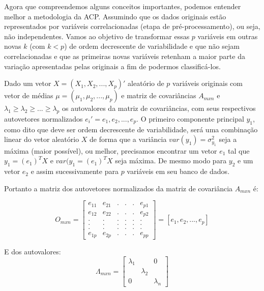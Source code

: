 \documentclass[
]{book}
\begin{document}
Agora que compreendemos alguns conceitos importantes, podemos entender melhor a metodologia da ACP. Assumindo que os dados originais estão representados por variáveis correlacionadas (etapa de pré-processamento), ou seja, não independentes. Vamos ao objetivo de transformar essas \(p\) variáveis em outras novas \(k\) (com \(k<p\)) de ordem decrescente de variabilidade e que não sejam correlacionadas e que as primeiras novas variáveis retenham a maior parte da variação apresentadas pelas originais a fim de podermos classificá-los.

Dado um vetor \(X=(X_1,X_2,..., X_p)'\) aleatório de \(p\) variáveis originais com vetor de médias \(\mu=(\mu_1,\mu_2,...,\mu_p)\) e matriz de covariâncias \(A_{mxn}\) e \(\lambda_1\geq\lambda_2\geq...\geq\lambda_p\) os autovalores da matriz de covariâncias, com seus respectivos autovetores normalizados \(e_i'=e_1,e_2,...,e_p\). O primeiro componente principal \(y_1\), como dito que deve ser ordem decrescente de variabilidade, será uma combinação linear do vetor aleatório \(X\) de forma que a variância \(var(y_1)=\sigma^2_{y_{1}}\) seja a máxima (maior possível), ou melhor, precisamos encontrar um vetor \(e_1\) tal que \(y_1=(e_1)^T X\) e \(var(y_1=(e_1)^T X\) seja máxima. De mesmo modo para \(y_2\) e um vetor \(e_2\) e assim sucessivamente para \(p\) variáveis em seu banco de dados.

Portanto a matriz dos autovetores normalizados da matriz de covariância \(A_{mxn}\) é:

\begin{equation}
    O_{mxn}= 
\begin{bmatrix}
e_{11} &e_{21}  &. &.  &. &e_{p1} \\ 
e_{12} &e_{22}  &. &.  &. &e_{p2} \\ 
.      &.       &. &.  &. &. \\ 
.      &.       &. &.  &. &. \\ 
.      &.       &. &.  &. &. \\ 
e_{1p} &e_{2p}  &. &.  &. &e_{pp} 
\end{bmatrix}
=[e_1,e_2,...,e_p]
\label{eq:autovetormatrix}
\end{equation}

E dos autovalores:
\begin{equation}
\Lambda_{mxn}=
\begin{bmatrix}
\lambda_1 & &0\\
& \lambda_2 & \\
0 & & \lambda_n
\label{eq:autovalormatrix}
\end{bmatrix}
\end{equation}
\end{document}
